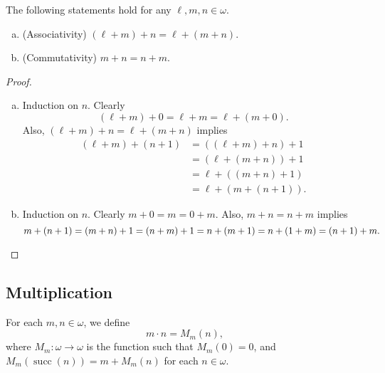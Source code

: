 \documentclass[11pt]{article}
\DeclareMathOperator{\suc}{succ}
\begin{document}
\begin{theorem}
  The following statements hold for any $\ell, m, n \in \omega$.
  \begin{enumerate}[(a)]
    \item (Associativity) $(\ell + m) + n = \ell + (m + n)$.
    \item (Commutativity) $m + n = n + m$.
  \end{enumerate}
\end{theorem}
\begin{proof}
  \leavevmode
  \begin{enumerate}[(a)]
    \item Induction on $n$.
    Clearly
    \begin{equation*}
      (\ell + m) + 0
      = \ell + m
      = \ell + (m + 0).
    \end{equation*}
    Also, $(\ell + m) + n = \ell + (m + n)$ implies
    \begin{align*}
      (\ell + m) + (n + 1)
      &= ((\ell + m) + n) + 1 \\
      &= (\ell + (m + n)) + 1 \\
      &= \ell + ((m + n) + 1) \\
      &= \ell + (m + (n + 1)).
    \end{align*}
    \item Induction on $n$.
    Clearly $m + 0 = m = 0 + m$.
    Also, $m + n = n + m$ implies
    \begin{equation*}
      m + (n + 1)
      = (m + n) + 1
      = (n + m) + 1
      = n + (m + 1)
      = n + (1 + m)
      = (n + 1) + m.
      \qedhere
    \end{equation*}
  \end{enumerate}
\end{proof}

\subsection{Multiplication}
\begin{definition}
  For each $m, n \in \omega$, we define
  \begin{equation*}
    m \cdot n = M_m(n),
  \end{equation*}
  where $M_m: \omega \to \omega$ is the function such that $M_m(0) = 0$, and $M_m(\suc(n)) = m + M_m(n)$ for each $n \in \omega$.
\end{definition}
\end{document}
